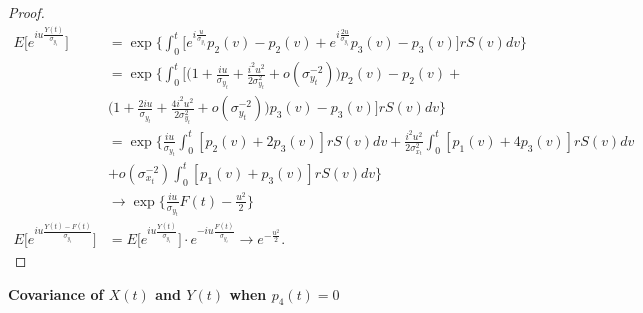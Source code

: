 \documentclass[12pt]{article}
\begin{document}
\begin{proof}
\begin{equation}
\begin{split}
E \Big[e^{iu \frac{Y(t)}{\sigma_{y_t}}} \Big] &= \exp \Big\{  \int_0^t \Big[ e^{i \frac{u}{\sigma_{y_t}}}p_2(v) - p_2(v) + e^{i \frac{2u}{\sigma_{y_t}}}p_3(v) - p_3(v)\Big] r S(v) dv\Big\} \\
& = \exp \Big\{ \int_0^t \Big[ \Big( 1 + \frac{iu}{\sigma_{y_t}} + \frac{i^2 u^2}{2 \sigma^2_{y_t}} + o(\sigma^{-2}_{y_t}) \Big) p_2(v) - p_2(v)+ \\
& \Big( 1 + \frac{2iu}{\sigma_{y_t}} + \frac{4 i^2 u^2}{2 \sigma^2_{y_t}} + o(\sigma^{-2}_{y_t}) \Big) p_3(v) - p_3(v)  \Big] r S(v) dv\Big\} \\
& = \exp \Big\{ \frac{iu}{\sigma_{y_t}}\int_0^t  [p_2(v) + 2p_3(v)] r S(v) dv +\frac{i^2u^2}{2\sigma^2_{x_t}} \int_0^t  [p_1(v) + 4p_3(v)] r S(v) dv \\
& +  o (\sigma^{-2}_{x_t})\int_0^t [p_1(v) + p_3(v)] r S(v) dv \Big\} \\
& \rightarrow \exp \Big\{\frac{iu}{\sigma_{y_t}} F(t)  - \frac{u^2}{2} \Big\} \\
E \Big[ e^{iu \frac{Y(t)-F(t)} {\sigma_{y_t}}} \Big] & = E \Big[e^{iu \frac{Y(t)}{\sigma_{y_t}}} \Big] \cdot e^{-iu \frac{F(t)}{\sigma_{y_t}}} \rightarrow e^{- \frac{u^2}{2 }}.
\end{split}
\end{equation}
\end{proof}

\textbf{Covariance of $X(t)$ and $Y(t)$ when $p_4(t) = 0$}
\end{document}
